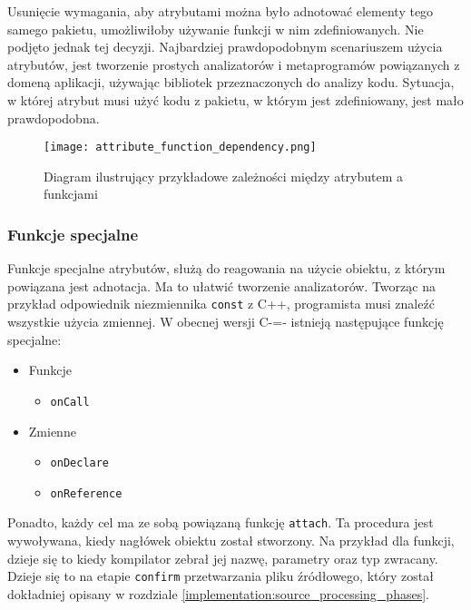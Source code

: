 Usunięcie wymagania, aby atrybutami można było adnotować elementy tego samego pakietu, umożliwiłoby używanie funkcji w nim zdefiniowanych.
Nie podjęto jednak tej decyzji.
Najbardziej prawdopodobnym scenariuszem użycia atrybutów, jest tworzenie prostych analizatorów i metaprogramów powiązanych z domeną aplikacji, używając bibliotek przeznaczonych do analizy kodu.
Sytuacja, w której atrybut musi użyć kodu z pakietu, w którym jest zdefiniowany, jest mało prawdopodobna.

\begin{figure}
	\caption{Diagram ilustrujący przykładowe zależności między atrybutem a funkcjami}
	\label{design:attributes:attribute_function_dependendcy}
	\texttt{[image: attribute\_function\_dependency.png]}
\end{figure}

\subsubsection{Funkcje specjalne}
\label{design:attributes:special_functions}

Funkcje specjalne atrybutów, służą do reagowania na użycie obiektu, z którym powiązana jest adnotacja.
Ma to ułatwić tworzenie analizatorów.
Tworząc na przykład odpowiednik niezmiennika \lstinline{const} z C++, programista musi znaleźć wszystkie użycia zmiennej.
W obecnej wersji C-=- istnieją następujące funkcję specjalne:
\begin{itemize}
	\item Funkcje\begin{itemize}
		\item \lstinline{onCall}
	\end{itemize}
	\item Zmienne\begin{itemize}
		\item \lstinline{onDeclare}
		\item \lstinline{onReference}
	\end{itemize}
\end{itemize}
Ponadto, każdy cel ma ze sobą powiązaną funkcję \lstinline{attach}.
Ta procedura jest wywoływana, kiedy nagłówek obiektu został stworzony.
Na przykład dla funkcji, dzieje się to kiedy kompilator zebrał jej nazwę, parametry oraz typ zwracany.
Dzieje się to na etapie \lstinline{confirm} przetwarzania pliku źródłowego, który został dokładniej opisany w rozdziale \ref{implementation:source_processing_phases}.

